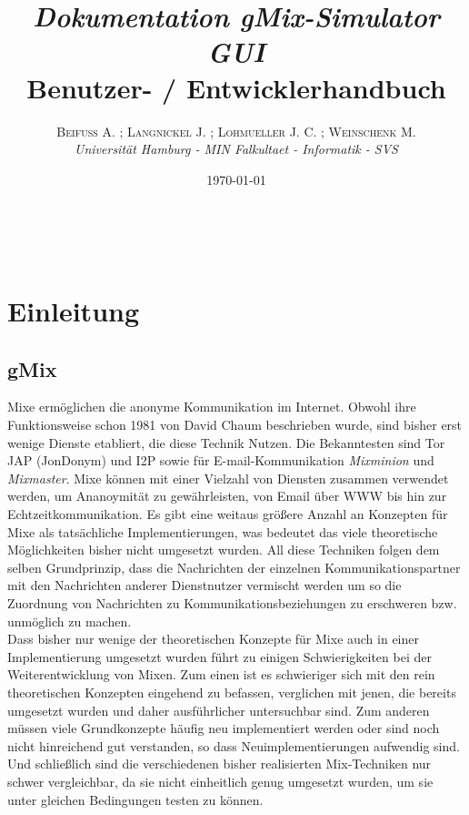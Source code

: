 \documentclass[a4paper, 11pt]{article} %
\title{\emph{Dokumentation gMix-Simulator GUI}\\ %
Benutzer- / Entwicklerhandbuch} %
\author{\textsc{Beifuß A. ; Langnickel J. ; Lohmueller J. C. ; Weinschenk M.} %
\\{\textit{Universität Hamburg - MIN Falkultaet - Informatik - SVS}}} %
\date{\today} %
\makeatletter
\renewcommand{\maketitle}{ %
\begin{flushright} %
{\LARGE\@title} %

\vspace{50pt} %

{\large\@author} %
\\\@date %

\vspace{40pt} %
\end{flushright}
}
\makeatother
\begin{document}
\maketitle %

 


\newpage
\tableofcontents


\vspace{30pt} %

\newpage
\section{Einleitung} %
\label{sec:einleitung}

\subsection{gMix} %
\label{sub:gmix}
Mixe ermöglichen die anonyme Kommunikation im Internet. Obwohl ihre Funktionsweise schon 1981 von David Chaum \cite{Cha81} beschrieben wurde, sind bisher erst wenige Dienste etabliert, die diese Technik Nutzen. Die Bekanntesten sind Tor \cite{DMS04} JAP (JonDonym) \cite{BFK01} und I2P sowie für E-mail-Kommunikation \emph{Mixminion} und \emph{Mixmaster}. Mixe können mit einer Vielzahl von Diensten zusammen verwendet werden, um Ananoymität zu gewährleisten, von Email über WWW bis hin zur Echtzeitkommunikation. Es gibt eine weitaus größere Anzahl an Konzepten für Mixe als tatsächliche Implementierungen, was bedeutet das viele theoretische Möglichkeiten bisher nicht umgesetzt wurden. All diese Techniken folgen dem selben Grundprinzip, dass die Nachrichten der einzelnen Kommunikationspartner mit den Nachrichten anderer Dienstnutzer vermischt werden um so die Zuordnung von Nachrichten zu Kommunikationsbeziehungen zu erschweren bzw. unmöglich zu machen.
\\

Dass bisher nur wenige der theoretischen Konzepte für Mixe auch in einer Implementierung umgesetzt wurden führt zu einigen Schwierigkeiten bei der Weiterentwicklung von Mixen. Zum einen ist es schwieriger sich mit den rein theoretischen Konzepten eingehend zu befassen, verglichen mit jenen, die bereits umgesetzt wurden und daher ausführlicher untersuchbar sind. Zum anderen müssen viele Grundkonzepte häufig neu implementiert werden oder sind noch nicht hinreichend gut verstanden, so dass Neuimplementierungen aufwendig sind. Und schließlich sind die verschiedenen bisher realisierten Mix-Techniken nur schwer vergleichbar, da sie nicht einheitlich genug umgesetzt wurden, um sie unter gleichen Bedingungen testen zu können.
\\
\end{document}
